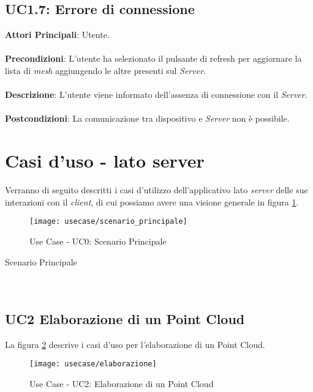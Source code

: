 \subsection{UC1.7: Errore di connessione}
\textbf{Attori Principali}: Utente.
\\\\ \textbf{Precondizioni}: L'utente ha selezionato il pulsante di refresh per aggiornare la lista di \emph{mesh} aggiungendo le altre presenti sul \emph{Server}.
\\\\ \textbf{Descrizione}: L'utente viene informato dell'assenza di connessione con il \emph{Server}.
\\\\ \textbf{Postcondizioni}: La comunicazione tra dispositivo e \emph{Server} non è possibile.



\section{Casi d'uso - lato server}
Verranno di seguito descritti i casi d'utilizzo dell'applicativo lato \emph{server} delle sue interazioni con il \emph{client}, di cui possiamo avere una visione generale in figura \ref{fig:scenario_principale}.
\begin{figure}[!h] 
    \centering 
    \texttt{[image: usecase/scenario\_principale]} 
    \caption{Use Case - UC0: Scenario Principale}
    \label{fig:scenario_principale}
\end{figure}
\newpage
\begin{usecase}{0}{Scenario Principale}
\\ 
\\ 
\\ 
\label{uc:scenario_principale}
\end{usecase}

\subsection{UC2 Elaborazione di un Point Cloud}
La figura \ref{fig:elaborazione} descrive i casi d'uso per l'elaborazione di un Point Cloud.
\begin{figure}[!h] 
    \centering 
    \texttt{[image: usecase/elaborazione]} 
    \caption{Use Case - UC2: Elaborazione di un Point Cloud}
    \label{fig:elaborazione}
\end{figure}

